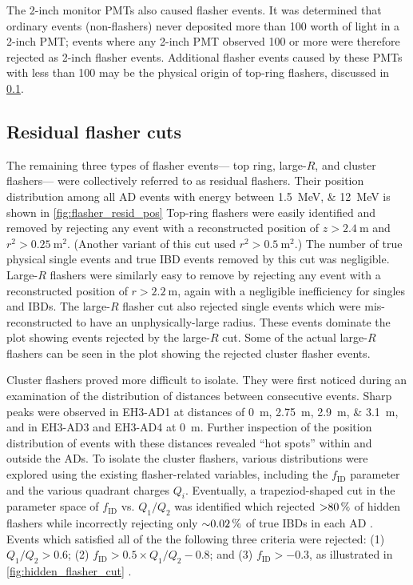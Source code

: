 The 2-inch monitor PMTs also caused flasher events.
It was determined that ordinary events (non-flashers)
never deposited more than \SI{100}{\pe} worth of light
in a 2-inch PMT;
events where any 2-inch PMT observed \SI{100}{\pe} or more
were therefore rejected as 2-inch flasher events.
Additional flasher events caused by these PMTs with less than \SI{100}{\pe}
may be the physical origin of top-ring flashers,
discussed in \cref{subsec:flash_resid}.

\subsection{Residual flasher cuts}
\label{subsec:flash_resid}

The remaining three types of flasher events---%
top ring, large-$R$, and cluster flashers---%
were collectively referred to as residual flashers.
Their position distribution among all AD events
with energy between \SIlist{1.5;12}{\MeV}
is shown in \cref{fig:flasher_resid_pos}
Top-ring flashers were easily identified and removed
by rejecting any event with a reconstructed position
of $z > \SI{2.4}{\m}$ and $r^2 > \SI{0.25}{\m\squared}$.
(Another variant of this cut used $r^2 > \SI{0.5}{\m\squared}$.)
The number of true physical single events and
true IBD events removed by this cut was negligible.
Large-$R$ flashers were similarly easy to remove
by rejecting any event with a reconstructed position
of $r > \SI{2.2}{\m}$,
again with a negligible inefficiency for singles and IBDs.
The large-$R$ flasher cut also rejected
single events which were mis-reconstructed to have an unphysically-large radius.
These events dominate the plot showing events rejected by the large-$R$ cut.
Some of the actual large-$R$ flashers can be seen in the plot
showing the rejected cluster flasher events.

Cluster flashers proved more difficult to isolate.
They were first noticed during an examination of the distribution of distances
between consecutive events.
Sharp peaks were observed in EH3-AD1 at distances of \SIlist{0;2.75;2.9;3.1}{\m},
and in EH3-AD3 and EH3-AD4 at \SI{0}{\m}.
Further inspection of the position distribution of events with these distances
revealed ``hot spots'' within and outside the ADs.
To isolate the cluster flashers,
various distributions were explored using the existing flasher-related variables,
including the $f_{\text{ID}}$ parameter and the various quadrant charges $Q_i$.
Eventually, a trapeziod-shaped cut in the parameter space of
$f_{\text{ID}}$ vs. $Q_1/Q_2$ was identified which rejected
$\SI{>80}{\percent}$ of hidden flashers while incorrectly rejecting only
$\SI{\sim0.02}{\percent}$ of true IBDs in each AD \cite{nh2021technote}.
Events which satisfied all of the the following three criteria were rejected:
(1) $Q_1/Q_2 > 0.6$; (2) $f_{\text{ID}} > 0.5 \times Q_1/Q_2 - 0.8$;
and (3) $f_{\text{ID}} > -0.3$,
as illustrated in \cref{fig:hidden_flasher_cut}
\cite{beda_resid_flasher_dt,flashers_jinjing}.


